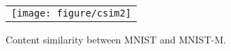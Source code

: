 \documentclass[final]{cvpr}
\begin{document}
\begin{figure}[t] 
	\centering
	\begin{tabular}{c@{\hspace{1mm}}}
    \texttt{[image: figure/csim2]} 
    \end{tabular}
	\caption{Content similarity between MNIST and MNIST-M.}
	\label{fig:confusion}
	\vspace{-3mm}
\end{figure}
\end{document}
